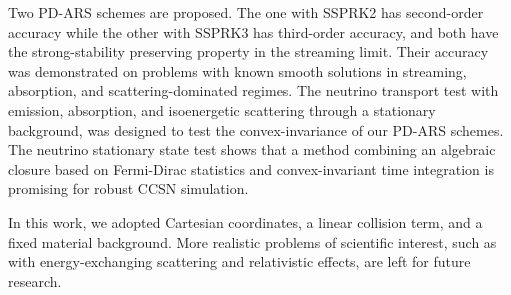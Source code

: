 Two PD-ARS schemes are proposed.
The one with SSPRK2 has second-order accuracy while the other with SSPRK3 has third-order accuracy, and both have the strong-stability preserving property in the streaming limit.  
Their accuracy was demonstrated on problems with known smooth solutions in streaming, absorption, and scattering-dominated regimes.
The neutrino transport test with emission, absorption, and isoenergetic scattering through a stationary background, was designed to test the convex-invariance of our PD-ARS schemes. 
The neutrino stationary state test shows that a method combining an algebraic closure based on Fermi-Dirac statistics and convex-invariant time integration is promising for robust CCSN simulation.

In this work, we adopted Cartesian coordinates, a linear collision term, and a fixed material background.
More realistic problems of scientific interest, such as with energy-exchanging scattering and relativistic effects, are left for future research.